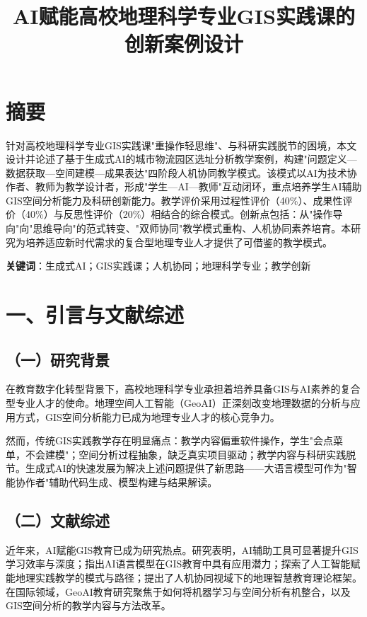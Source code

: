 \documentclass[12pt, a4paper]{article}
\begin{document}
\title{\textbf{AI赋能高校地理科学专业GIS实践课的创新案例设计}}

\newpage

\section{摘要}

针对高校地理科学专业GIS实践课"重操作轻思维"、与科研实践脱节的困境，本文设计并论述了基于生成式AI的城市物流园区选址分析教学案例，构建"问题定义—数据获取—空间建模—成果表达"四阶段人机协同教学模式。该模式以AI为技术协作者、教师为教学设计者，形成"学生—AI—教师"互动闭环，重点培养学生AI辅助GIS空间分析能力及科研创新能力。教学评价采用过程性评价（40\%）、成果性评价（40\%）与反思性评价（20\%）相结合的综合模式。创新点包括：从"操作导向"向"思维导向"的范式转变、"双师协同"教学模式重构、人机协同素养培育。本研究为培养适应新时代需求的复合型地理专业人才提供了可借鉴的教学模式。

\textbf{关键词}：生成式AI；GIS实践课；人机协同；地理科学专业；教学创新

\newpage

\section{一、引言与文献综述}

\subsection{（一）研究背景}

在教育数字化转型背景下，高校地理科学专业承担着培养具备GIS与AI素养的复合型专业人才的使命。地理空间人工智能（GeoAI）正深刻改变地理数据的分析与应用方式\citep{Jiang2023GeoAI}，GIS空间分析能力已成为地理专业人才的核心竞争力。

然而，传统GIS实践教学存在明显痛点：教学内容偏重软件操作，学生"会点菜单，不会建模"\citep{杜清运2017}；空间分析过程抽象，缺乏真实项目驱动；教学内容与科研实践脱节\citep{王民2018}。生成式AI的快速发展为解决上述问题提供了新思路——大语言模型可作为"智能协作者"辅助代码生成、模型构建与结果解读\citep{Dwivedi2023}。

\subsection{（二）文献综述}

近年来，AI赋能GIS教育已成为研究热点。\citet{Zhang2023AI}研究表明，AI辅助工具可显著提升GIS学习效率与深度；\citet{Wang2020}指出AI语言模型在GIS教育中具有应用潜力；\citet{Zhao2021}探索了人工智能赋能地理实践教学的模式与路径；\citet{Luo2022}提出了人机协同视域下的地理智慧教育理论框架。在国际领域，GeoAI教育研究聚焦于如何将机器学习与空间分析有机整合\citep{Klosterman2015}，以及GIS空间分析的教学内容与方法改革\citep{杜清运2017}。
\end{document}
